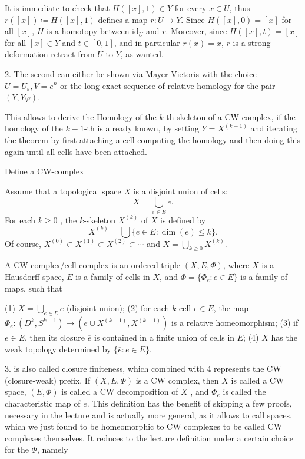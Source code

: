 It is immediate to check that \( H([x], 1) \in Y \) for every \( x \in U \), thus \( r([x]) \coloneqq H([x], 1) \) defines a map \( r: U \rightarrow Y \). 
Since \( H([x], 0) = [x] \) for all \( [x] \), \( H \) is a homotopy between \( \text{id}_U \) and \( r \). 
Moreover, since \( H([x], t) = [x] \) for all \( [x] \in Y \) and \( t \in [0, 1] \), and in particular \( r(x) = x \), \(r\) is a 
strong deformation retract from \( U \) to \( Y \), as wanted.

2. The second can either be shown via Mayer-Vietoris with the choice \( U = U_\varepsilon, V = e^n \) or the long exact sequence 
of relative homology for the pair \( (Y, Y\varphi) \).

This allows to derive the Homology of the \( k \)-th skeleton of a CW-complex, 
if the homology of the \( k-1 \)-th is already known, by setting \( Y = X^{(k-1)} \) and iterating the theorem by first attaching
a cell computing the homology and then doing this again until all cells have been attached.


Define a CW-complex

Assume that a topological space \( X \) is a disjoint union of cells:
\[ X = \bigcup_{e \in E} e. \] 
For each \( k \geq 0 \) , the \(k\)-skeleton \(X^{(k)}\) of \(X\) is defined by 
\[ X^{(k)} = \bigcup \{e \in E: \dim(e) \leq k\}. \]
Of course, \(X^{(0)} \subset X^{(1)} \subset X^{(2)} \subset \dotsb\) and \(X = \bigcup_{k \geq 0} X^{(k)}\).

A CW complex/cell complex is an ordered triple \( (X, E, \Phi) \), where \( X \) is a Hausdorff space, \( E \) is a family of cells in \( X \), 
and \( \Phi = \{\Phi_e : e \in E\} \) is a family of maps, such that 

(1) \( X = \bigcup_{e \in E} e \) (disjoint union); 
(2) for each \( k \)-cell \( e \in E \), the map \( \Phi_e : (D^k, S^{k-1}) \to (e \cup X^{(k-1)}, X^{(k-1)}) \) is a relative homeomorphism; 
(3) if \( e \in E \), then its closure \( \overline{e} \) is contained in a finite union of cells in \( E \); 
(4) \( X \) has the weak topology determined by \( \{\overline{e} : e \in E\} \). 

3. is also called closure finiteness, which combined with 4 represents the CW (closure-weak) prefix.
If \( (X, E, \Phi) \) is a CW complex, then \( X \) is called a CW space, \( (E, \Phi) \) is called a CW decomposition of \( X \) , 
and \( \Phi_e \) is called the characteristic map of \( e \).
This definition has the benefit of skipping a few proofs, necessary in the lecture and is actually more general,
as it allows to call spaces, which we just found to be homeomorphic to CW complexes to be called CW complexes themselves.
It reduces to the lecture definition under a certain choice for the \( \Phi \), namely

